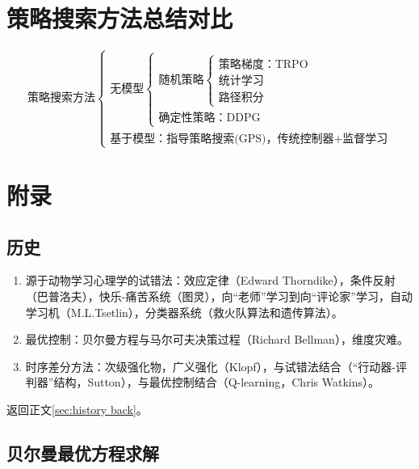 \documentclass[
12pt, %
a4paper, 
oneside, %
headinclude,footinclude, %
]{scrartcl}
\begin{document}
\section{策略搜索方法总结对比}
$$
\text{策略搜索方法} \begin{cases} 
\text{无模型} \begin{cases} 
\text{随机策略} \begin{cases} 
\text{策略梯度：TRPO} \\ 
\text{统计学习} \\ 
\text{路径积分} 
\end{cases} \\ 
\text{确定性策略：DDPG}
\end{cases} \\ 
\text{基于模型：指导策略搜索(GPS)，传统控制器+监督学习}
\end{cases}
$$
\section{附录}
\subsection{历史}\label{sec:history}
\begin{enumerate}
\item 源于动物学习心理学的试错法：效应定律（Edward Thorndike），条件反射（巴普洛夫），快乐-痛苦系统（图灵），向“老师”学习到向“评论家”学习，自动学习机（M.L.Tsetlin），分类器系统（救火队算法和遗传算法）。
\item 最优控制：贝尔曼方程与马尔可夫决策过程（Richard Bellman），维度灾难。
\item 时序差分方法：次级强化物，广义强化（Klopf），与试错法结合（“行动器-评判器”结构，Sutton），与最优控制结合（Q-learning，Chris Watkins）。
\end{enumerate}

返回正文\ref{sec:history back}。
\subsection{贝尔曼最优方程求解}\label{sec:Scalability Mapping}
\end{document}
